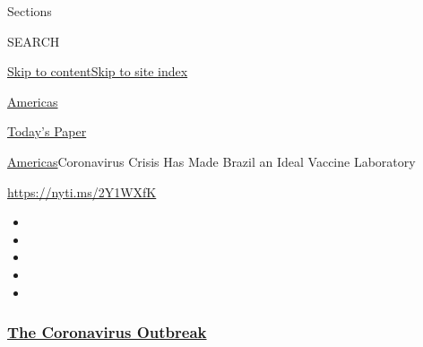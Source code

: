 Sections

SEARCH

\protect\hyperlink{site-content}{Skip to
content}\protect\hyperlink{site-index}{Skip to site index}

\href{https://www.nytimes3xbfgragh.onion/section/world/americas}{Americas}

\href{https://myaccount.nytimes3xbfgragh.onion/auth/login?response_type=cookie\&client_id=vi}{}

\href{https://www.nytimes3xbfgragh.onion/section/todayspaper}{Today's
Paper}

\href{/section/world/americas}{Americas}\textbar{}Coronavirus Crisis Has
Made Brazil an Ideal Vaccine Laboratory

\url{https://nyti.ms/2Y1WXfK}

\begin{itemize}
\item
\item
\item
\item
\item
\end{itemize}

\hypertarget{the-coronavirus-outbreak}{%
\subsubsection{\texorpdfstring{\href{https://www.nytimes3xbfgragh.onion/news-event/coronavirus?name=styln-coronavirus-national\&region=TOP_BANNER\&variant=undefined\&block=storyline_menu_recirc\&action=click\&pgtype=Article\&impression_id=3e07c1c0-e386-11ea-bbe8-bf70f691015a}{The
Coronavirus
Outbreak}}{The Coronavirus Outbreak}}\label{the-coronavirus-outbreak}}

